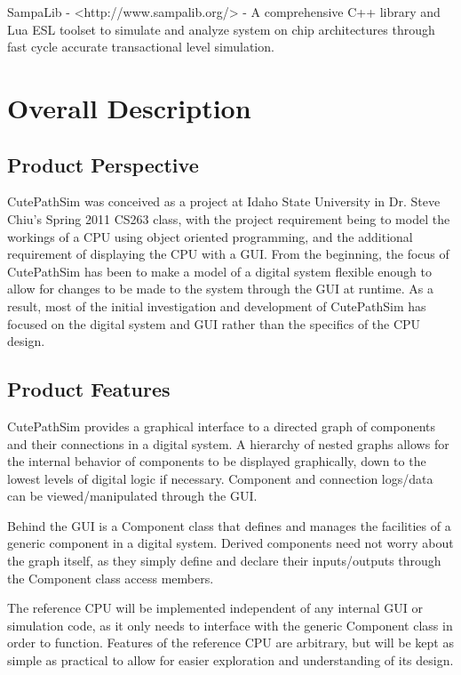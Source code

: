 \documentclass[12pt]{article}
\begin{document}
SampaLib - {\textless}http://www.sampalib.org/{\textgreater} - A comprehensive C++ library and Lua  ESL toolset to simulate and analyze system on chip architectures through fast cycle accurate transactional level simulation.

\section{Overall Description}

\subsection{Product Perspective}
CutePathSim was conceived as a project at Idaho State University in Dr. Steve Chiu’s Spring 2011 CS263 class, with the project requirement being to model the workings of a CPU using object oriented programming, and the additional requirement of displaying the CPU with a GUI. From the beginning, the focus of CutePathSim has been to make a model of a digital system flexible enough to allow for changes to be made to the system through the GUI at runtime. As a result, most of the initial investigation and development of CutePathSim has focused on the digital system and GUI rather than the specifics of the CPU design.

\subsection{Product Features}
CutePathSim provides a graphical interface to a directed graph of components and their connections in a digital system. A hierarchy of nested graphs allows for the internal behavior of components to be displayed graphically, down to the lowest levels of digital logic if necessary. Component and connection logs/data can be viewed/manipulated through the GUI.

Behind the GUI is a Component class that defines and manages the facilities of a generic component in a digital system. Derived components need not worry about the graph itself, as they simply define and declare their inputs/outputs through the Component class access members.

The reference CPU will be implemented independent of any internal GUI or simulation code, as it only needs to interface with the generic Component class in order to function. Features of the reference CPU are arbitrary, but will be kept as simple as practical to allow for easier exploration and understanding of its design.
\end{document}

